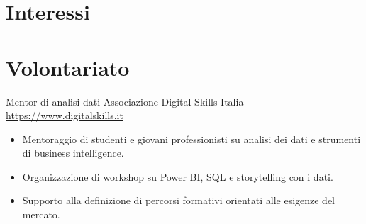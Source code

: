 \documentclass[a4paper, serif, 10pt]{moderncv}
\begin{document}
\section{Interessi}

\section{Volontariato}

        {Mentor di analisi dati}
        {Associazione Digital Skills Italia}
        {\url{https://www.digitalskills.it}}
        {}
        {\begin{itemize}
\item Mentoraggio di studenti e giovani professionisti su analisi dei dati e strumenti di business intelligence.
\item Organizzazione di workshop su Power BI, SQL e storytelling con i dati.
\item Supporto alla definizione di percorsi formativi orientati alle esigenze del mercato.
\end{itemize}}
    
\end{document}
